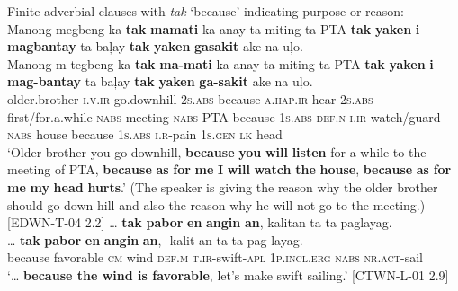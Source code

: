 \ea
Finite adverbial clauses with \textit{tak} ‘because’ indicating purpose or reason:   \\
Manong  megbeng  ka  \textbf{tak}  \textbf{mamati}  ka  anay ta  miting  ta  PTA  \textbf{tak}  \textbf{yaken}  \textbf{i}  \textbf{magbantay} ta  baļay  \textbf{tak}  \textbf{yaken}  \textbf{gasakit}  ake  na  uļo. \smallskip\\
\gll Manong  m-tegbeng  ka  \textbf{tak}  \textbf{ma-mati}  ka  anay ta  miting  ta  PTA  \textbf{tak}  \textbf{yaken}  \textbf{i}  \textbf{mag-bantay} ta  baļay  \textbf{tak}  \textbf{yaken}  \textbf{ga-sakit}  ake  na  uļo. \\
older.brother  \textsc{i.v.ir}-go.downhill  2\textsc{s.abs}  because  \textsc{a.hap.ir}-hear  2\textsc{s.abs}  first/for.a.while
\textsc{nabs}  meeting  \textsc{nabs}  PTA  because  1\textsc{s.abs}  \textsc{def.n}  \textsc{i.ir}-watch/guard
\textsc{nabs}  house  because  1\textsc{s.abs}  \textsc{i.r}-pain  1\textsc{s.gen}  \textsc{lk}  head \\
\glt `Older brother you go downhill, \textbf{because} \textbf{you} \textbf{will} \textbf{listen} for a while to the meeting of PTA, \textbf{because} \textbf{as} \textbf{for} \textbf{me} \textbf{I} \textbf{will} \textbf{watch} \textbf{the} \textbf{house}, \textbf{because} \textbf{as} \textbf{for} \textbf{me} \textbf{my} \textbf{head} \textbf{hurts}.’ (The speaker is giving the reason why the older brother should go down hill and also the reason why he will not go to the meeting.) [EDWN-T-04 2.2]
\z
\ea
 … \textbf{tak}  \textbf{pabor}  \textbf{en}  \textbf{angin}  \textbf{an},  kalitan    ta  ta  paglayag. \smallskip\\
\gll … \textbf{tak}  \textbf{pabor}  \textbf{en}  \textbf{angin}  \textbf{an},  \emptyset{}-kalit-an    ta  ta  pag-layag. \\
{} because  favorable  \textsc{cm}  wind  \textsc{def.m}  \textsc{t.ir}-swift-\textsc{apl}  1\textsc{p.incl.erg}  \textsc{nabs}  \textsc{nr.act}-sail \\
\glt ‘… \textbf{because the wind is favorable}, let’s make swift sailing.’ [CTWN-L-01 2.9]
\z

